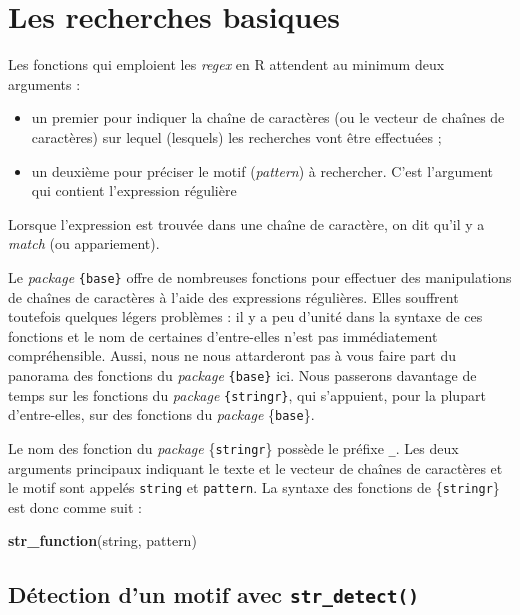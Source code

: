 \documentclass[
  11pt,
]{book}
\newenvironment{Shaded}{\begin{snugshade}}{\end{snugshade}}
\newcommand{\KeywordTok}[1]{\textcolor[rgb]{0.13,0.29,0.53}{\textbf{#1}}}
\newcommand{\NormalTok}[1]{#1}
\providecommand{\tightlist}{%
  \setlength{\itemsep}{0pt}\setlength{\parskip}{0pt}}
\numberwithin{equation}{section}
\numberwithin{countremarque}{section}
\begin{document}
\hypertarget{manip_regex_structure}{%
\section{Les recherches basiques}\label{manip_regex_structure}}

Les fonctions qui emploient les \emph{regex} en R attendent au minimum deux arguments :

\begin{itemize}
\tightlist
\item
  un premier pour indiquer la chaîne de caractères (ou le vecteur de chaînes de caractères) sur lequel (lesquels) les recherches vont être effectuées ;
\item
  un deuxième pour préciser le motif (\emph{pattern}) à rechercher. C'est l'argument qui contient l'expression régulière
\end{itemize}

Lorsque l'expression est trouvée dans une chaîne de caractère, on dit qu'il y a \emph{match} (ou appariement).

Le \emph{package} \texttt{\{base\}} offre de nombreuses fonctions pour effectuer des manipulations de chaînes de caractères à l'aide des expressions régulières. Elles souffrent toutefois quelques légers problèmes : il y a peu d'unité dans la syntaxe de ces fonctions et le nom de certaines d'entre-elles n'est pas immédiatement compréhensible. Aussi, nous ne nous attarderont pas à vous faire part du panorama des fonctions du \emph{package} \texttt{\{base\}} ici. Nous passerons davantage de temps sur les fonctions du \emph{package} \texttt{\{stringr\}}, qui s'appuient, pour la plupart d'entre-elles, sur des fonctions du \emph{package} \{\texttt{base}\}.

Le nom des fonction du \emph{package} \{\texttt{stringr}\} possède le préfixe \texttt{\_}. Les deux arguments principaux indiquant le texte et le vecteur de chaînes de caractères et le motif sont appelés \texttt{string} et \texttt{pattern}. La syntaxe des fonctions de \{\texttt{stringr}\} est donc comme suit :

\begin{Shaded}
\begin{Highlighting}[]
\KeywordTok{str\_function}\NormalTok{(string, pattern)}
\end{Highlighting}
\end{Shaded}

\hypertarget{manip_regex_stringr_detect}{%
\subsection{\texorpdfstring{Détection d'un motif avec \texttt{str\_detect()}}{Détection d'un motif avec str\_detect()}}\label{manip_regex_stringr_detect}}
\end{document}

